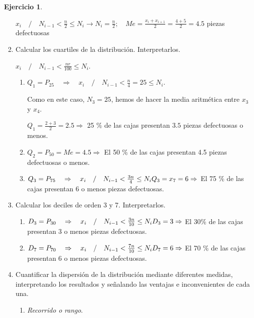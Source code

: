 \documentclass[a4paper, 12pt]{article}
\theoremstyle{definition}
\newtheorem{ej}{Ejercicio}
\begin{document}
\begin{ej}
\begin{enumerate}[label=\textit{\alph*)}]
    
    \(x_i\quad/\quad N_{i-1} < \frac{n}{2} \leq N_i \rightarrow N_i = \frac{n}{2}; \quad Me = \frac{x_i+x_{i+1}}{2}=\frac{4+5}{2} = 4.5 \) piezas defectuosas
    
    \item Calcular los cuartiles de la distribución.  Interpretarlos.
    
    \(x_i\quad/\quad N_{i-1} <\frac{nr}{100} \leq N_i\).
    
    \begin{enumerate}[label=]
    \item \(Q_1 = P_{25} \quad \Rightarrow \quad x_i\quad/\quad N_{i-1} <\frac{n}{4} = 25 \leq N_i\).
    
    Como en este caso, \(N_3 = 25\), hemos de hacer la media aritmética entre \(x_3\) y \(x_4\).
    
    \(Q_1 = \frac{2+3}{2} = 2.5 \Rightarrow\) 25 \% de las cajas presentan \(3.5\) piezas defectuosas o menos. \\
    \item \(Q_2 = P_{50} = Me = 4.5 \Rightarrow\) El 50 \% de las cajas presentan 4.5 piezas defectuosas o menos. \\
     \item \(Q_3 = P_{75}\quad \Rightarrow \quad x_i\quad/\quad N_{i-1} < \frac{3n}{4}\leq N_i\\Q_3 = x_7 = 6 \Rightarrow\) El 75 \% de las cajas presentan 6 o menos piezas defectuosas.
    \end{enumerate}
    \item Calcular los deciles de orden 3 y 7. Interpretarlos. 
    
    \begin{enumerate}[label=]
        \item \(D_3 = P_{30}\quad\Rightarrow\quad x_i\quad/\quad N_{i-1} < \frac{3n}{10} \leq N_i \\D_3 = 3 \Rightarrow\) El 30\% de las cajas presentan 3 o menos piezas defectuosas.
        \item \(D_7 = P_{70}\quad\Rightarrow\quad x_i\quad/\quad N_{i-1} < \frac{7n}{10} \leq N_i \\D_7 = 6 \Rightarrow\) El 70 \% de las cajas presentan 6 o menos piezas defectuosas.
    \end{enumerate}
    \item Cuantificar la dispersión de la distribución mediante diferentes medidas, interpretando los resultados y señalando las ventajas e inconvenientes de cada una.
    \begin{enumerate}[label=\arabic*)]
        \item \textit{Recorrido o rango}.
        

\end{enumerate}
\end{enumerate}
\end{ej}
\end{document}
